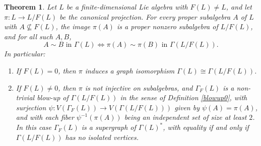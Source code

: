 \documentclass[11pt]{amsart}
\theoremstyle{plain}
\newtheorem{theorem}{Theorem}[section]
\begin{document}
\begin{theorem}\label{blowup}
Let $L$ be a finite-dimensional Lie algebra with $F(L) \neq L$, and let
$\pi : L \to L/F(L)$ be the canonical projection. For every proper subalgebra
$A$ of $L$ with $A \not\subseteq F(L)$, the image $\pi(A)$ is a proper
nonzero subalgebra of $L/F(L)$, and for all such $A, B$,
\[A \sim B \text{ in } \Gamma(L)\iff \pi(A) \sim \pi(B) \text{ in } \Gamma(L/F(L)).\]
In particular:
\begin{enumerate}
\item If $F(L) = 0$, then $\pi$ induces a graph isomorphism $\Gamma(L) \cong \Gamma(L/F(L))$.

\item If $F(L) \neq 0$, then $\pi$ is not injective on subalgebras, and
      $\Gamma_F(L)$ is a non-trivial blow-up of $\Gamma(L/F(L))$ in the
      sense of Definition \ref{blowup0}, with surjection
      $\psi : V(\Gamma_F(L)) \to V(\Gamma(L/F(L)))$ given by $\psi(A) =
      \pi(A)$, and with each fiber $\psi^{-1}(\pi(A))$ being an independent
      set of size at least $2$. In this case $\Gamma_F(L)$ is a supergraph
      of $\Gamma(L)^*$, with equality if and only if $\Gamma(L/F(L))$ has
      no isolated vertices.
\end{enumerate}
\end{theorem}
\end{document}
